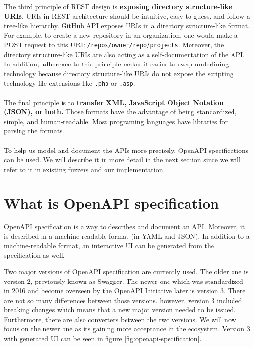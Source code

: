 \paragraph{}
The third principle of REST design is \textbf{exposing directory structure-like URIs}. URIs in REST architecture should be intuitive, easy to guess, and follow a tree-like hierarchy. GitHub API exposes URIs in a directory structure-like format. For example, to create a new repository in an organization, one would make a POST request to this URI: \texttt{/repos/{owner}/{repo}/projects}. Moreover, the directory structure-like URIs are also acting as a self-documentation of the API. In addition, adherence to this principle makes it easier to swap underlining technology because directory structure-like URIs do not expose the scripting technology file extensions like \texttt{.php} or \texttt{.asp}.

\paragraph{}
The final principle is to \textbf{transfer XML, JavaScript Object Notation (JSON), or both.} Those formats have the advantage of being standardized, simple, and human-readable. Most programing languages have libraries for parsing the formats.

\paragraph{}
To help us model and document the APIs more precisely, OpenAPI specifications can be used. We will describe it in more detail in the next section since we will refer to it in existing fuzzers and our implementation.


\section{What is OpenAPI specification}
\label{sec:openapi}
OpenAPI specification is a way to describes and document an API. Moreover, it is described in a  machine-readable format (in YAML and JSON). In addition to a machine-readable format, an interactive UI can be generated from the specification as well.

Two major versions of OpenAPI specification are currently used. The older one is version 2, previously known as Swagger. The newer one which was standardized in 2016 and become overseen by the OpenAPI Initiative \cite{openapi2020main} later is version 3. There are not so many differences between those versions, however, version 3 included breaking changes which means that a new major version needed to be issued. Furthermore, there are also converters between the two versions. We will now focus on the newer one as its gaining more acceptance in the ecosystem. Version 3 with generated UI can be seen in figure \ref{fig:openapi-specification}.

